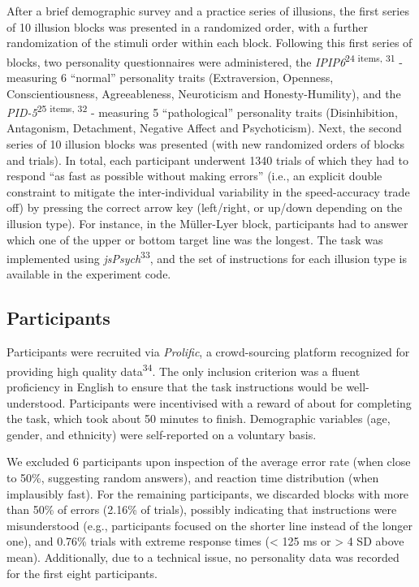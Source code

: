 \documentclass[
  man,floatsintext]{apa6}
\begin{document}
After a brief demographic survey and a practice series of illusions, the first series of 10 illusion blocks was presented in a randomized order, with a further randomization of the stimuli order within each block. Following this first series of blocks, two personality questionnaires were administered, the \emph{IPIP6}\textsuperscript{24 items, 31} - measuring 6 ``normal'' personality traits (Extraversion, Openness, Conscientiousness, Agreeableness, Neuroticism and Honesty-Humility), and the \emph{PID-5}\textsuperscript{25 items, 32} - measuring 5 ``pathological'' personality traits (Disinhibition, Antagonism, Detachment, Negative Affect and Psychoticism). Next, the second series of 10 illusion blocks was presented (with new randomized orders of blocks and trials). In total, each participant underwent 1340 trials of which they had to respond ``as fast as possible without making errors'' (i.e., an explicit double constraint to mitigate the inter-individual variability in the speed-accuracy trade off) by pressing the correct arrow key (left/right, or up/down depending on the illusion type). For instance, in the Müller-Lyer block, participants had to answer which one of the upper or bottom target line was the longest. The task was implemented using \emph{jsPsych}\textsuperscript{33}, and the set of instructions for each illusion type is available in the experiment code.

\hypertarget{participants}{%
\subsection{Participants}\label{participants}}

Participants were recruited via \emph{Prolific}, a crowd-sourcing platform recognized for providing high quality data\textsuperscript{34}. The only inclusion criterion was a fluent proficiency in English to ensure that the task instructions would be well-understood. Participants were incentivised with a reward of about  for completing the task, which took about 50 minutes to finish. Demographic variables (age, gender, and ethnicity) were self-reported on a voluntary basis.

We excluded 6 participants upon inspection of the average error rate (when close to 50\%, suggesting random answers), and reaction time distribution (when implausibly fast). For the remaining participants, we discarded blocks with more than 50\% of errors (2.16\% of trials), possibly indicating that instructions were misunderstood (e.g., participants focused on the shorter line instead of the longer one), and 0.76\% trials with extreme response times (\textless{} 125 ms or \textgreater{} 4 SD above mean). Additionally, due to a technical issue, no personality data was recorded for the first eight participants.
\end{document}
